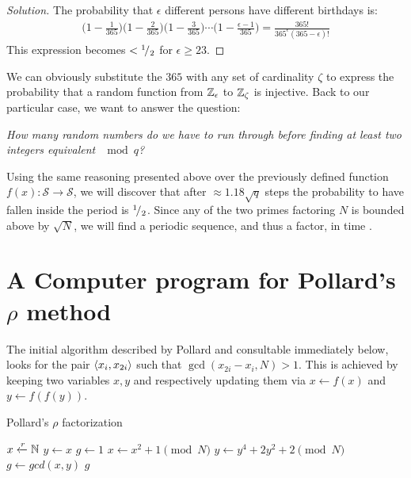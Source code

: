 \begin{proof}[Solution]
  The probability that $\epsilon$ different persons have different birthdays is:
  \begin{align*}
    \Big(1 - \frac{1}{365}\Big)
    \Big(1 - \frac{2}{365}\Big)
    \Big(1 - \frac{3}{365}\Big)
    \cdots
    \Big(1 - \frac{\epsilon -1}{365}\Big)
    =
    \frac{365!}{365^\epsilon (365-\epsilon)!}
  \end{align*}
  This expression becomes $< {}^{1}\!/_{2}$ for $\epsilon \geq 23$.
\end{proof}

We can obviously substitute the $365$ with any set of cardinality $\zeta$
to express the probability that a random function from $\mathbb{Z}_{\epsilon}$
to $\mathbb{Z}_{\zeta}$ is injective. Back to our particular case,
we want to answer the question:

\emph{
  How many random numbers do we have to run through before finding at least
  two integers equivalent $\mod{q}$?
}


Using the same reasoning presented above over the previously defined function
$f(x): \mathcal{S} \to \mathcal{S}$, we will discover that after
$\approx 1.18 \sqrt{q}$ steps the probability to have fallen inside the period
is ${}^{1}\!/_{2}$. %
Since any of the two primes factoring $N$ is bounded above by $\sqrt{N}$, we
will find a periodic sequence, and thus a factor, in time .


\section{A Computer program for Pollard's $\rho$ method}

The initial algorithm described by Pollard \cite{pollardMC} and consultable
immediately below, looks for the pair $\langle x_i, x_{2i}\rangle$ such that
$\gcd(x_{2i} - x_i, N) > 1$.  This is achieved by keeping two variables $x, y$
and respectively updating them via $x \gets f(x)$ and $y \gets f(f(y))$.

\begin{algorithm}
  \caption{Pollard's $\rho$ factorization}
  \begin{algorithmic}[1]
    \State $x \xleftarrow{r} \mathbb{N}$
    \State $y \gets x$
    \State $g \gets 1$
      \State $x \gets x^2 + 1 \pmod{N}$
      \State $y \gets y^4 + 2y^2 + 2 \pmod{N}$
      \State $g \gets gcd(x, y)$
    \EndWhile
    \Return $g$
    \EndFunction
  \end{algorithmic}
\end{algorithm}

